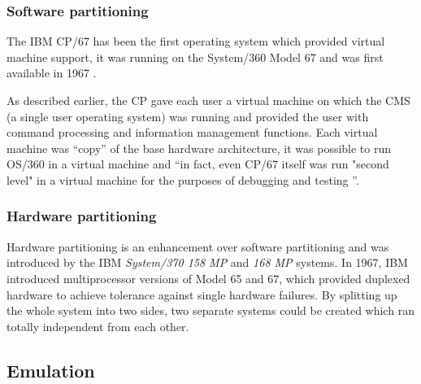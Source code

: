 \subsubsection{Software partitioning}
\label{sec:softw-part}

The IBM CP/67  has been the first operating  system which provided virtual
machine support, it  was running on the System/360 Model  67 and was first
available in 1967 \cite{borden89}.

As described earlier, the CP gave each user a virtual machine on which the
CMS (a  single user  operating system) was  running and provided  the user
with command processing and information management functions. Each virtual
machine was ``copy'' of the base hardware architecture, it was possible to
run OS/360 in  a virtual machine and ``in fact, even  CP/67 itself was run
"second  level" in a  virtual machine  for the  purposes of  debugging and
testing \cite{borden89}''.

\subsubsection{Hardware partitioning}
\label{sec:hardw-part}

Hardware partitioning is an enhancement over software partitioning and was
introduced  by  the  IBM   \emph{System/370  158  MP}  and  \emph{168  MP}
systems. In 1967,  IBM introduced multiprocessor versions of  Model 65 and
67, which  provided duplexed hardware to achieve  tolerance against single
hardware failures.  By  splitting up the whole system  into two sides, two
separate systems could be created  which ran totally independent from each
other.

\subsection{Emulation}
\label{sec:emulation}

